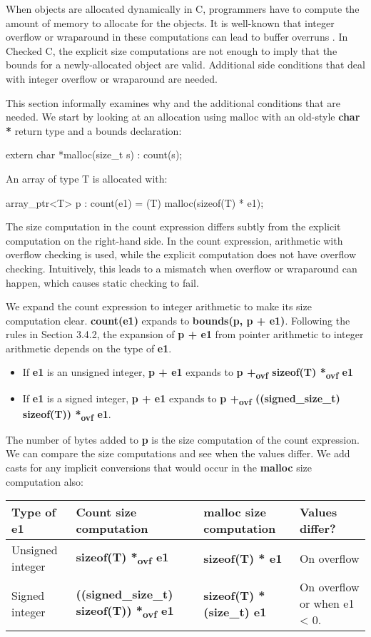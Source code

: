 \documentclass[]{article}
\begin{document}
When objects are allocated dynamically in C, programmers have to compute
the amount of memory to allocate for the objects. It is well-known that
integer overflow or wraparound in these computations can lead to buffer
overruns . In Checked C, the explicit size computations are not enough
to imply that the bounds for a newly-allocated object are valid.
Additional side conditions that deal with integer overflow or wraparound
are needed.

This section informally examines why and the additional conditions that
are needed. We start by looking at an allocation using malloc with an
old-style \textbf{char *} return type and a bounds declaration:

extern char *malloc(size\_t s) : count(s);

An array of type T is allocated with:

array\_ptr\textless{}T\textgreater{} p : count(e1) = (T)
malloc(sizeof(T) * e1);

The size computation in the count expression differs subtly from the
explicit computation on the right-hand side. In the count expression,
arithmetic with overflow checking is used, while the explicit
computation does not have overflow checking. Intuitively, this leads to
a mismatch when overflow or wraparound can happen, which causes static
checking to fail.

We expand the count expression to integer arithmetic to make its size
computation clear. \textbf{count(e1)} expands to \textbf{bounds(p, p +
e1)}. Following the rules in Section 3.4.2, the expansion of \textbf{p +
e1} from pointer arithmetic to integer arithmetic depends on the type of
\textbf{e1}.

\begin{itemize}
\item
  If \textbf{e1} is an unsigned integer, \textbf{p + e1} expands to
  \textbf{p +\textsubscript{ovf} sizeof(T) *\textsubscript{ovf} e1}
\item
  If \textbf{e1} is a signed integer, \textbf{p + e1} expands to
  \textbf{p +\textsubscript{ovf} ((signed\_size\_t) sizeof(T))
  *\textsubscript{ovf} e1}.
\end{itemize}

The number of bytes added to \textbf{p} is the size computation of the
count expression. We can compare the size computations and see when the
values differ. We add casts for any implicit conversions that would
occur in the \textbf{malloc} size computation also:

\begin{longtable}[c]{@{}llll@{}}
\toprule
Type of e1 & Count size computation & \textbf{malloc} size computation &
Values differ?\tabularnewline
\midrule
\endhead
Unsigned integer & \textbf{sizeof(T) *\textsubscript{ovf} e1} &
\textbf{sizeof(T) * e1} & On overflow\tabularnewline
Signed integer & \textbf{((signed\_size\_t) sizeof(T))
*\textsubscript{ovf} e1} & \textbf{sizeof(T) * (size\_t) e1} & On
overflow or when e1 \textless{} 0.\tabularnewline
\bottomrule
\end{longtable}
\end{document}
